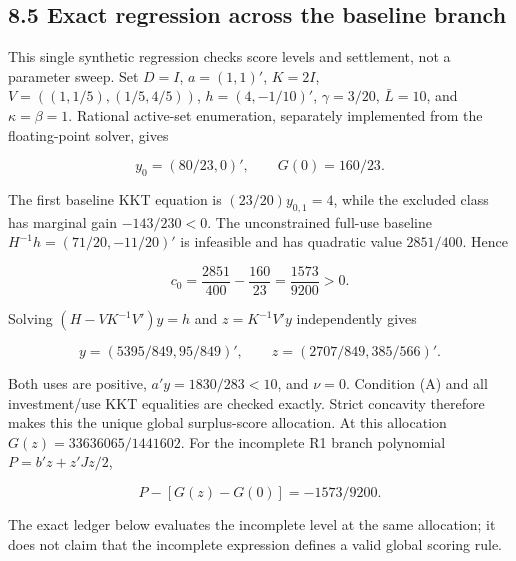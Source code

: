 \documentclass[
  11pt,
]{article}
\begin{document}
\subsection{8.5 Exact regression across the baseline
branch}\label{exact-regression-across-the-baseline-branch}

This single synthetic regression checks score levels and settlement, not
a parameter sweep. Set \(D=I\), \(a=(1,1)'\), \(K=2I\),
\(V=((1,1/5),(1/5,4/5))\), \(h=(4,-1/10)'\), \(\gamma=3/20\),
\(\bar L=10\), and \(\kappa=\beta=1\). Rational active-set enumeration,
separately implemented from the floating-point solver, gives

\[y_0=(80/23,0)',\qquad G(0)=160/23.\]

The first baseline KKT equation is \((23/20)y_{0,1}=4\), while the
excluded class has marginal gain \(-143/230<0\). The unconstrained
full-use baseline \(H^{-1}h=(71/20,-11/20)'\) is infeasible and has
quadratic value \(2851/400\). Hence

\[c_0=\frac{2851}{400}-\frac{160}{23}=\frac{1573}{9200}>0. \tag{29}\]

Solving \((H-VK^{-1}V')y=h\) and \(z=K^{-1}V'y\) independently gives

\[y=(5395/849,95/849)',\qquad z=(2707/849,385/566)'.\]

Both uses are positive, \(a'y=1830/283<10\), and \(\nu=0\). Condition
(A) and all investment/use KKT equalities are checked exactly. Strict
concavity therefore makes this the unique global surplus-score
allocation. At this allocation \(G(z)=33636065/1441602\). For the
incomplete R1 branch polynomial \(P=b'z+z'Jz/2\),

\[P-[G(z)-G(0)]=-1573/9200.\]

The exact ledger below evaluates the incomplete level at the same
allocation; it does not claim that the incomplete expression defines a
valid global scoring rule.
\end{document}

